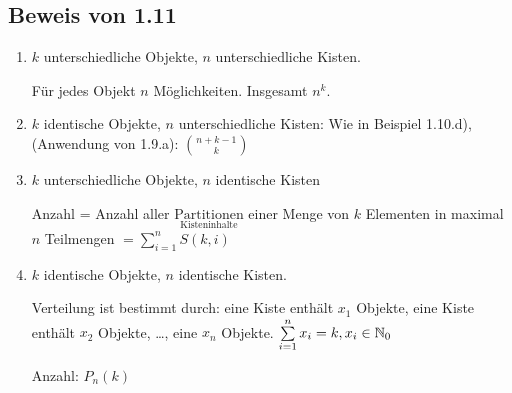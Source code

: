 \subsection*{Beweis von 1.11} %

\begin{enumerate}
	\item
	$k$ unterschiedliche Objekte, $n$ unterschiedliche Kisten. 
	
	Für jedes Objekt $n$ Möglichkeiten. Insgesamt $n^k$.
	
	\item
	$k$ identische Objekte, $n$ unterschiedliche Kisten:
	Wie in Beispiel 1.10.d), %
	(Anwendung von 1.9.a): %
	$\binom{n+k-1}{k}$	
	
	\item
	$k$ unterschiedliche Objekte, $n$ identische Kisten 
	
	Anzahl = Anzahl aller $\underset{\text{Kisteninhalte}}{\text{Partitionen}}$ %
	 einer Menge von $k$ Elementen in maximal $n$ Teilmengen
	 $= \sum_{i=1}^nS(k, i)$
	 
	 \item
	 $k$ identische Objekte, $n$ identische Kisten. 
	 
	 Verteilung ist bestimmt durch: eine Kiste enthält $x_1$ Objekte, eine Kiste enthält $x_2$ Objekte, \dots, eine $x_n$ Objekte.
	 $\sum_{i=1}^{n}x_i=k, x_i \in \N_0$
	 
	 Anzahl: $P_n(k)$
	
\end{enumerate}












